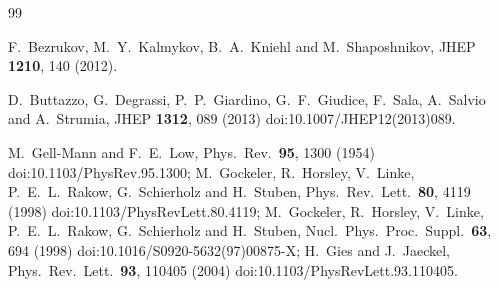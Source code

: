 \documentclass[%
 reprint,
 superscriptaddress,
preprintnumbers,
nofootinbib,
 amsmath,amssymb,
 aps,
prl,
]{revtex4-1}
\begin{document}
\begin{thebibliography}{99}

%
  F.~Bezrukov, M.~Y.~Kalmykov, B.~A.~Kniehl and M.~Shaposhnikov,
  JHEP {\bf 1210}, 140 (2012).
  
  D.~Buttazzo, G.~Degrassi, P.~P.~Giardino, G.~F.~Giudice, F.~Sala, A.~Salvio and A.~Strumia,
  JHEP {\bf 1312}, 089 (2013)
  doi:10.1007/JHEP12(2013)089.
  
  M.~Gell-Mann and F.~E.~Low,
  Phys.\ Rev.\  {\bf 95}, 1300 (1954)
  doi:10.1103/PhysRev.95.1300;
  M.~Gockeler, R.~Horsley, V.~Linke, P.~E.~L.~Rakow, G.~Schierholz and H.~Stuben,
  Phys.\ Rev.\ Lett.\  {\bf 80}, 4119 (1998)
  doi:10.1103/PhysRevLett.80.4119;
  M.~Gockeler, R.~Horsley, V.~Linke, P.~E.~L.~Rakow, G.~Schierholz and H.~Stuben,
  Nucl.\ Phys.\ Proc.\ Suppl.\  {\bf 63}, 694 (1998)
  doi:10.1016/S0920-5632(97)00875-X;
  H.~Gies and J.~Jaeckel,
  Phys.\ Rev.\ Lett.\  {\bf 93}, 110405 (2004)
  doi:10.1103/PhysRevLett.93.110405.


\end{thebibliography}
\end{document}

